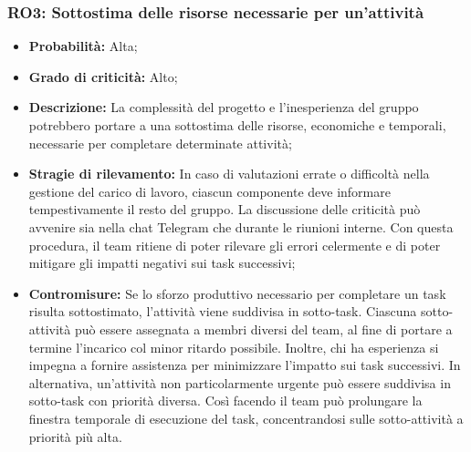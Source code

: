\subsubsection{RO3: Sottostima delle risorse necessarie per un'attività}
\begin{itemize}
    \item \textbf{Probabilità:} Alta;
    \item \textbf{Grado di criticità:} Alto;
    \item \textbf{Descrizione:} La complessità del progetto e l'inesperienza del gruppo potrebbero portare a una sottostima delle risorse, economiche e temporali, necessarie per completare determinate attività;
    \item \textbf{Stragie di rilevamento:} In caso di valutazioni errate o difficoltà nella gestione del carico di lavoro, ciascun componente deve informare tempestivamente il resto del gruppo. La discussione delle criticità può avvenire sia nella chat Telegram che durante le riunioni interne. Con questa procedura, il team ritiene di poter rilevare gli errori celermente e di poter mitigare gli impatti negativi sui task successivi;
    \item \textbf{Contromisure:} Se lo sforzo produttivo necessario per completare un task risulta sottostimato, l'attività viene suddivisa in sotto-task. Ciascuna sotto-attività può essere assegnata a membri diversi del team, al fine di portare a termine l’incarico col minor ritardo possibile. Inoltre, chi ha esperienza si impegna a fornire assistenza per minimizzare l'impatto sui task successivi. In alternativa, un’attività non particolarmente urgente può essere suddivisa in sotto-task con priorità diversa. Così facendo il team può prolungare la finestra temporale di esecuzione del task, concentrandosi sulle sotto-attività a priorità più alta.
\end{itemize}
